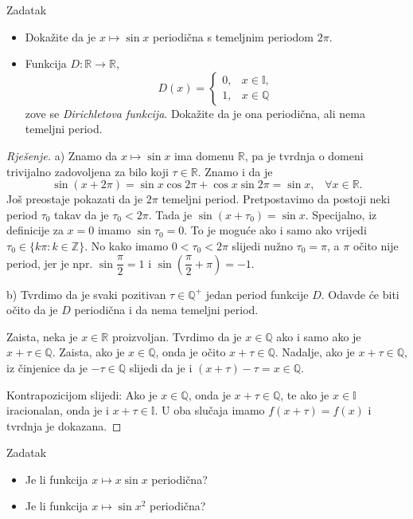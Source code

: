 \begin{exercise}{Zadatak} \textbf{}
\begin{itemize}
\item[a)] Dokažite da je \(x\mapsto \sin{x}\) periodična s temeljnim periodom \(2\pi\).
\item[b)] Funkcija \(D : \mathbb{R}\to \mathbb{R}\),
\[D(x)=\begin{cases}
0, & x\in \mathbb{I},\\
1, & x\in \mathbb{Q}
\end{cases}\]
zove se \textit{Dirichletova funkcija}. Dokažite da je ona periodična, ali nema temeljni period. 
\end{itemize}
\end{exercise}
\begin{proof}[Rješenje]
a) Znamo da \(x\mapsto \sin{x}\) ima domenu \(\mathbb{R}\), pa je tvrdnja o domeni trivijalno zadovoljena za bilo koji \(\tau\in \mathbb{R}\). Znamo i da je \[\sin(x+2\pi)=\sin{x}\cos{2\pi}+\cos{x}\sin{2\pi}=\sin{x},\;\;\; \forall x\in \mathbb{R}.\] Još preostaje pokazati da je \(2\pi\) temeljni period. Pretpostavimo da postoji neki period \(\tau_0\) takav da je \(\tau_0<2\pi\). Tada je \(\sin(x+\tau_0)=\sin{x}\). Specijalno, iz definicije za \(x=0\) imamo \(\sin{\tau_0}=0\). To je moguće ako i samo ako vrijedi \(\tau_0\in \{k\pi : k\in \mathbb{Z}\}\). No kako imamo \(0<\tau_0<2\pi\) slijedi nužno \(\tau_0=\pi\), a \(\pi\) očito nije period, jer je npr. \(\sin{\dfrac{\pi}{2}}=1\) i \(\sin\left(\dfrac{\pi}{2}+\pi\right)=-1\).

b) Tvrdimo da je svaki pozitivan \(\tau\in \mathbb{Q^+}\) jedan period funkcije \(D\). Odavde će biti očito da je \(D\) periodična i da nema temeljni period.

Zaista, neka je \(x\in \mathbb{R}\) proizvoljan. Tvrdimo da je \(x\in \mathbb{Q}\) ako i samo ako je \(x+\tau\in \mathbb{Q}\). Zaista, ako je \(x\in \mathbb{Q}\), onda je očito \(x+\tau\in \mathbb{Q}\). Nadalje, ako je \(x+\tau\in \mathbb{Q}\), iz činjenice da je \(-\tau\in \mathbb{Q}\) slijedi da je i \((x+\tau)-\tau=x\in \mathbb{Q}\).

Kontrapozicijom slijedi: Ako je \(x\in \mathbb{Q}\), onda je \(x+\tau\in \mathbb{Q}\), te ako je \(x\in \mathbb{I}\) iracionalan, onda je i \(x+\tau\in \mathbb{I}\). U oba slučaja imamo \(f(x+\tau)=f(x)\) i tvrdnja je dokazana.
\end{proof}
\begin{exercise}{Zadatak} \textbf{}
\begin{itemize}
\item[a)] Je li funkcija \(x\mapsto x\sin{x}\) periodična?
\item[b)] Je li funkcija \(x\mapsto \sin{x^2}\) periodična? 
\end{itemize}
\end{exercise}
